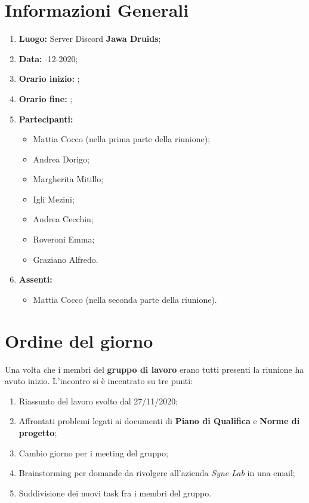 \newpage
	\section{Informazioni Generali}
	\begin{enumerate}
		\item \textbf{Luogo:} \normalfont Server Discord \textbf{Jawa Druids};
		\item \textbf{Data:} -12-2020;
		\item \textbf{Orario inizio:} ;
		\item \textbf{Orario fine:} ;
		\item \textbf{Partecipanti:}
		\begin{itemize}
			\item Mattia Cocco (nella prima parte della riunione); 
			\item Andrea Dorigo;
			\item Margherita Mitillo;
			\item Igli Mezini;
			\item Andrea Cecchin;
			\item Roveroni Emma;
			\item Graziano Alfredo.
		\end{itemize}
		\item \textbf{Assenti:}
		\begin{itemize}
			\item Mattia Cocco (nella seconda parte della riunione).
		\end{itemize}
	\end{enumerate}
	
	\section{Ordine del giorno}
	Una volta che i membri del \textbf{gruppo di lavoro} erano tutti presenti la riunione ha avuto inizio.
	L'incontro si è incentrato su tre punti:
	\begin{enumerate}
		\item Riassunto del lavoro svolto dal 27/11/2020;
		
		\item Affrontati problemi legati ai documenti di \textbf{Piano di Qualifica} e \textbf{Norme di progetto};
		
		\item Cambio giorno per i meeting del gruppo;
		
		\item Brainstorming per domande da rivolgere all'azienda \textit{Sync Lab} in una email;
		
		\item Suddivisione dei nuovi task fra i membri del gruppo.
	\end{enumerate}
